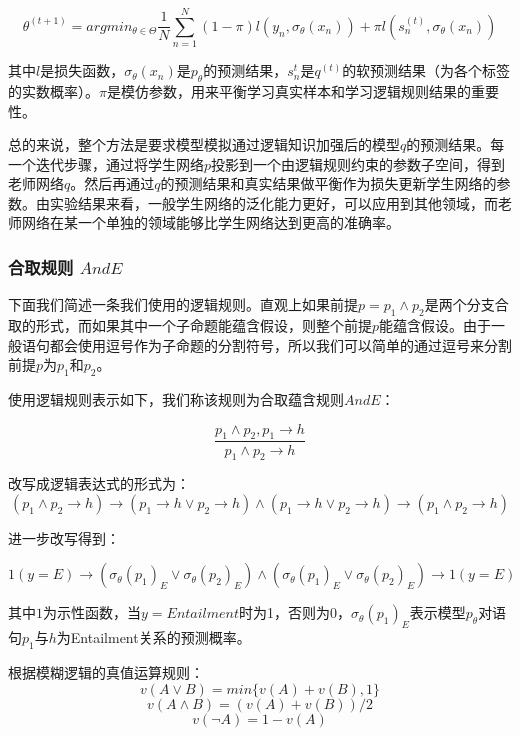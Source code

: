 \documentclass[UTF8,11pt,a4paper,nofonts]{ctexart}
\begin{document}
\begin{equation}
\theta^{(t+1)} = argmin_{\theta\in \Theta} \frac{1}{N}\sum^N_{n=1}(1-\pi)l(y_n,\sigma_\theta(x_n)) + \pi l(s^{(t)}_n,\sigma_\theta(x_n)) 
\end{equation}

其中$l$是损失函数，$\sigma_\theta(x_n)$是$p_\theta$的预测结果，$s_n^{t}$是$q^{(t)}$的软预测结果（为各个标签的实数概率）。$\pi$是模仿参数，用来平衡学习真实样本和学习逻辑规则结果的重要性。

总的来说，整个方法是要求模型模拟通过逻辑知识加强后的模型$q$的预测结果。每一个迭代步骤，通过将学生网络$p$投影到一个由逻辑规则约束的参数子空间，得到老师网络$q$。然后再通过$q$的预测结果和真实结果做平衡作为损失更新学生网络的参数。由实验结果来看，一般学生网络的泛化能力更好，可以应用到其他领域，而老师网络在某一个单独的领域能够比学生网络达到更高的准确率。

\subsubsection{合取规则 $AndE$}

下面我们简述一条我们使用的逻辑规则。直观上如果前提$p=p_1 \land p_2$是两个分支合取的形式，而如果其中一个子命题能蕴含假设，则整个前提$p$能蕴含假设。由于一般语句都会使用逗号作为子命题的分割符号，所以我们可以简单的通过逗号来分割前提$p$为$p_1$和$p_2$。

使用逻辑规则表示如下，我们称该规则为合取蕴含规则$AndE$：

\begin{equation}
\frac{p_1 \land p_2, p_1 \to h}{p_1 \land p_2 \to h}
\end{equation}


改写成逻辑表达式的形式为：
\begin{equation}
 (p_1 \land p_2 \to h) \to (p_1 \to h \vee p_2 \to h) \land (p_1 \to h \vee p_2 \to h) \to (p_1 \land p_2 \to h)
\end{equation}

进一步改写得到：

\begin{equation}
1(y=E) \to (\sigma_\theta(p_1)_E \vee \sigma_\theta(p_2)_E) \land (\sigma_\theta(p_1)_E \vee \sigma_\theta(p_2)_E) \to 1(y=E)
\end{equation}

其中$1$为示性函数，当$y=Entailment$时为1，否则为0，$\sigma_\theta(p_1)_E$表示模型$p_\theta$对语句$p_1$与$h$为Entailment关系的预测概率。

根据模糊逻辑的真值运算规则：
\begin{equation}
v(A \vee B) = min\{v(A)+v(B),1\}
\end{equation}
\begin{equation}
v(A \land B) = (v(A) + v(B)) / 2
\end{equation}
\begin{equation}
v(\neg A) = 1 - v(A)
\end{equation}
\end{document}
